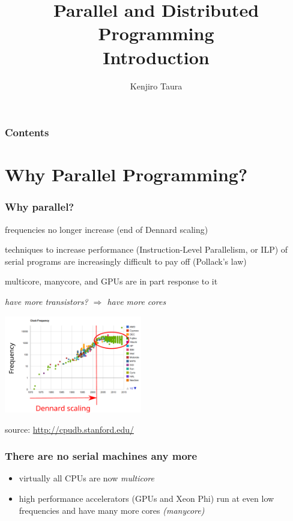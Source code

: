 \documentclass[12pt,dvipdfmx]{beamer}
\title{Parallel and Distributed Programming \\ Introduction}
\institute{}
\author{Kenjiro Taura}
\date{}
\newcommand{\ao}[1]{{\color{blue}#1}}
\begin{document}
\maketitle

\begin{frame}
\frametitle{Contents}
\tableofcontents
\end{frame}

\section{Why Parallel Programming?}

\begin{frame}
\frametitle{Why parallel?}
\begin{itemize}
\item<1-> frequencies no longer increase \ao{(end of Dennard scaling)}
\item<2-> techniques to increase performance 
  (Instruction-Level Parallelism, or ILP) of serial programs are increasingly
  difficult to pay off \ao{(Pollack's law)}
\item<3-> multicore, manycore, and GPUs are in part response to it
  \begin{center}
  \item \ao{\textit{have more transistors? $\Rightarrow$ have more cores}}
  \end{center}
\end{itemize}

\begin{center}
  \includegraphics[width=0.45\textwidth]{out/pdf/svg/frequency.pdf}
    
  source: \url{http://cpudb.stanford.edu/}
\end{center}
\end{frame}

\begin{frame}
\frametitle{There are no serial machines any more}
\begin{itemize}
\item virtually all CPUs are now \ao{\textit{multicore}}
\item high performance accelerators (GPUs and Xeon Phi) run at
  even low frequencies and have many more cores \ao{\textit{(manycore)}}
\end{itemize}
\end{frame}
\end{document}
